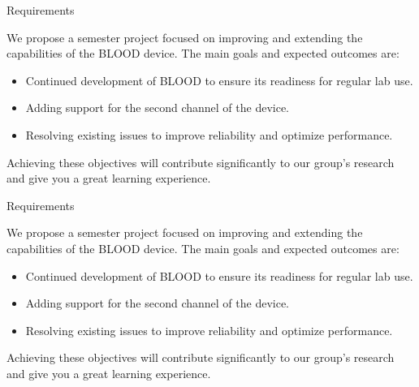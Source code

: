 \documentclass{project-proposal}
\begin{document}
\begin{sectiontwocolumns}{Requirements}
    {We propose a semester project focused on improving and extending the
        capabilities of the BLOOD device. The main goals and expected outcomes are:

        \begin{itemize}
            \item {Continued development of BLOOD to ensure its readiness for regular lab use.}
            \item {Adding support for the second channel of the device.}
            \item {Resolving existing issues to improve reliability and optimize performance.}
        \end{itemize}

        Achieving these objectives will contribute significantly to our group's research and
        give you a great learning experience.}
    {Requirements}
    {We propose a semester project focused on improving and extending the
        capabilities of the BLOOD device. The main goals and expected outcomes are:

        \begin{itemize}
            \item {Continued development of BLOOD to ensure its readiness for regular lab use.}
            \item {Adding support for the second channel of the device.}
            \item {Resolving existing issues to improve reliability and optimize performance.}
        \end{itemize}

        Achieving these objectives will contribute significantly to our group's research and
        give you a great learning experience.}
\end{sectiontwocolumns}
\end{document}
